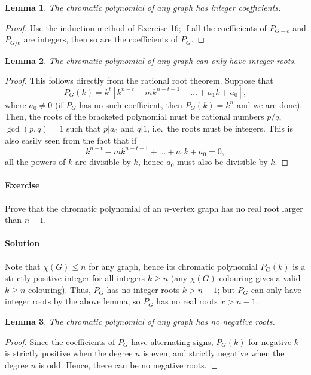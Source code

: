 \documentclass[10pt]{article}
\newcounter{prob}
\newcommand{\problem}{\stepcounter{prob}\paragraph{Exercise \arabic{prob}}}
\newcommand{\solution}{\paragraph{Solution}}
\newtheorem{lemma}{Lemma}
\begin{document}
    \begin{lemma}
        The chromatic polynomial of any graph has integer coefficients.
    \end{lemma}
    \begin{proof}
        Use the induction method of Exercise 16; if all the coefficients of $P_{G -
        e}$ and $P_{G / e}$ are integers, then so are the coefficients of $P_G$.
    \end{proof}

    \begin{lemma}
        The chromatic polynomial of any graph can only have integer roots.
    \end{lemma}
    \begin{proof}
        This follows directly from the rational root theorem. Suppose that \[
            P_G(k) = k^t\left[k^{n - t} - mk^{n - t - 1} + \dots + a_1k + a_0\right],
        \] where $a_0 \neq 0$ (if $P_G$ has no such coefficient, then $P_G(k) = k^n$
        and we are done). Then, the roots of the bracketed polynomial must be
        rational numbers $p / q$, $\gcd(p, q) = 1$ such that $p | a_0$ and $q | 1$,
        i.e.\ the roots must be integers. This is also easily seen from the fact that
        if \[
             k^{n - t} - mk^{n - t - 1} + \dots + a_1k + a_0 = 0,
        \] all the powers of $k$ are divisible by $k$, hence $a_0$ must also be
        divisible by $k$.
    \end{proof}


    \problem Prove that the chromatic polynomial of an $n$-vertex graph has no real
    root larger than $n - 1$.

    \solution Note that $\chi(G) \leq n$ for any graph, hence its chromatic
    polynomial $P_G(k)$ is a strictly positive integer for all integers $k \geq n$
    (any $\chi(G)$ colouring gives a valid $k \geq n$ colouring). Thus, $P_G$ has no
    integer roots $k > n - 1$; but $P_G$ can only have integer roots by the above
    lemma, so $P_G$ has no real roots $x > n - 1$.


    \begin{lemma}
        The chromatic polynomial of any graph has no negative roots.
    \end{lemma}
    \begin{proof}
        Since the coefficients of $P_G$ have alternating signs, $P_G(k)$ for negative
        $k$ is strictly positive when the degree $n$ is even, and strictly negative
        when the degree $n$ is odd. Hence, there can be no negative roots.
    \end{proof}
\end{document}
